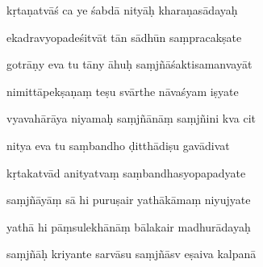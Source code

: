 \documentclass[article,12pt,a4paper]{memoir}%
\newcounter{parCount}
\begin{document}
	  
	  \pstart {} kṛtaṇatvāś ca ye śabdā nityāḥ kharaṇasādayaḥ 
	{}
	\pend%
      

	  
	  \pstart \leavevmode%
	ekadravyopadeśitvāt tān sādhūn saṃpracakṣate 
	{}
	\pend%
      

	  
	  \pstart {} gotrāṇy eva tu tāny āhuḥ saṃjñāśaktisamanvayāt 
	{}
	\pend%
      

	  
	  \pstart \leavevmode%
	nimittāpekṣaṇaṃ teṣu svārthe nāvaśyam iṣyate 
	{}
	\pend%
      

	  
	  \pstart {} vyavahārāya niyamaḥ saṃjñānāṃ saṃjñini kva cit 
	{}
	\pend%
      

	  
	  \pstart \leavevmode%
	nitya eva tu saṃbandho ḍitthādiṣu gavādivat 
	{}
	\pend%
      

	  
	  \pstart {} kṛtakatvād anityatvaṃ saṃbandhasyopapadyate 
	{}
	\pend%
      

	  
	  \pstart \leavevmode%
	saṃjñāyāṃ sā hi puruṣair yathākāmaṃ niyujyate 
	{}
	\pend%
      

	  
	  \pstart {} yathā hi pāṃsulekhānāṃ bālakair madhurādayaḥ 
	{}
	\pend%
      

	  
	  \pstart \leavevmode%
	saṃjñāḥ kriyante sarvāsu saṃjñāsv eṣaiva kalpanā 
	{}
	\pend%
      
\end{document}
